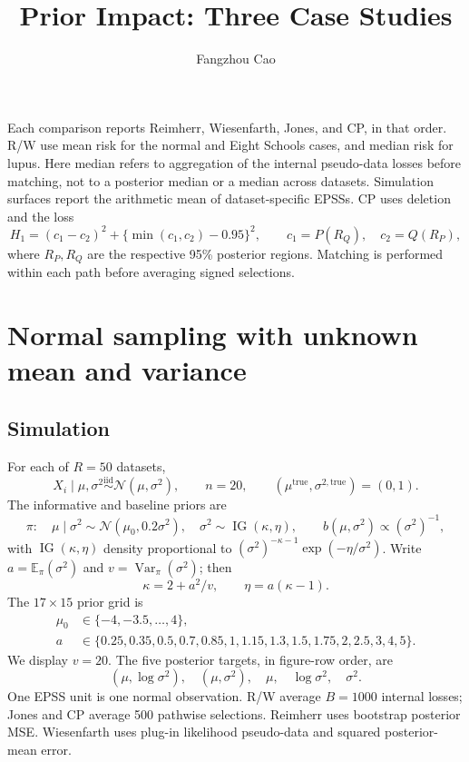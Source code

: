 \documentclass[11pt]{article}
\title{Prior Impact: Three Case Studies}
\author{Fangzhou Cao}
\date{}
\newcommand{\Normal}{\mathcal N}
\newcommand{\E}{\mathbb E}
\newcommand{\Var}{\operatorname{Var}}
\newcommand{\IG}{\operatorname{IG}}
\begin{document}
\maketitle

Each comparison reports Reimherr, Wiesenfarth, Jones, and CP, in that order.
R/W use mean risk for the normal and Eight Schools cases, and median risk
for lupus. Here median refers to aggregation of the internal pseudo-data
losses before matching, not to a posterior median or a median across datasets.
Simulation surfaces report the arithmetic mean of dataset-specific EPSSs. CP uses deletion and the loss
\[
 H_1=(c_1-c_2)^2+\{\min(c_1,c_2)-0.95\}^2,
 \qquad c_1=P(R_Q),\quad c_2=Q(R_P),
\]
where $R_P,R_Q$ are the respective 95\% posterior regions. Matching is
performed within each path before averaging signed selections.

\section{Normal sampling with unknown mean and variance}

\subsection{Simulation}
For each of $R=50$ datasets,
\[
 X_i\mid\mu,\sigma^2\overset{\mathrm{iid}}\sim\Normal(\mu,\sigma^2),
 \qquad n=20,\qquad(\mu^{\mathrm{true}},\sigma^{2,\mathrm{true}})=(0,1).
\]
The informative and baseline priors are
\[
 \pi:\quad \mu\mid\sigma^2\sim\Normal(\mu_0,0.2\sigma^2),
 \quad\sigma^2\sim\IG(\kappa,\eta),
 \qquad b(\mu,\sigma^2)\propto(\sigma^2)^{-1},
\]
with $\IG(\kappa,\eta)$ density proportional to
$(\sigma^2)^{-\kappa-1}\exp(-\eta/\sigma^2)$. Write
$a=\E_\pi(\sigma^2)$ and $v=\Var_\pi(\sigma^2)$; then
\[
 \kappa=2+a^2/v,\qquad \eta=a(\kappa-1).
\]
The $17\times15$ prior grid is
\begin{align*}
 \mu_0&\in\{-4,-3.5,\ldots,4\},\\
 a&\in\{0.25,0.35,0.5,0.7,0.85,1,1.15,1.3,1.5,1.75,2,2.5,3,4,5\}.
\end{align*}
We display $v=20$. The five posterior targets, in figure-row
order, are
\[
 (\mu,\log\sigma^2),\quad(\mu,\sigma^2),\quad
 \mu,\quad\log\sigma^2,\quad\sigma^2.
\]
One EPSS unit is one normal observation. R/W average $B=1000$ internal
losses; Jones and CP average 500 pathwise selections. Reimherr uses
bootstrap posterior MSE. Wiesenfarth uses plug-in likelihood pseudo-data and squared posterior-mean error.
\end{document}
